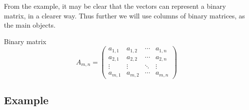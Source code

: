 \documentclass{beamer}
\begin{document}
\begin{frame}
  From the example, it may be clear that the vectors can represent a
  \alert{binary matrix}, in a clearer way. Thus further we will use columns of binary
  matrices, as the main objects.

  \begin{block}{Binary matrix}
    \[
      A_{m,n} =
      \begin{pmatrix}
        a_{1,1} & a_{1,2} & \cdots & a_{1,n} \\
        a_{2,1} & a_{2,2} & \cdots & a_{2,n} \\
        \vdots  & \vdots  & \ddots & \vdots  \\
        a_{m,1} & a_{m,2} & \cdots & a_{m,n}
      \end{pmatrix}
    \]
  \end{block}
\end{frame}

\subsection{Example}
\end{document}

